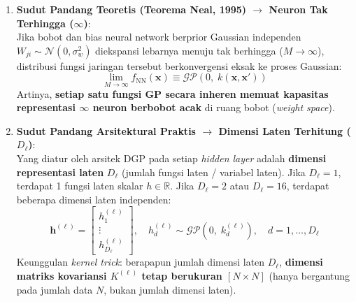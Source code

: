 \documentclass[11pt,a4paper]{article}
\begin{document}
\begin{enumerate}
    \item \textbf{Sudut Pandang Teoretis (Teorema Neal, 1995) $\to$ Neuron Tak Terhingga ($\infty$)}: \\
    Jika bobot dan bias neural network berprior Gaussian independen $W_{ji} \sim \mathcal{N}(0, \sigma_w^2)$ diekspansi lebarnya menuju tak berhingga ($M \to \infty$), distribusi fungsi jaringan tersebut berkonvergensi eksak ke proses Gaussian:
    \begin{equation}
        \lim_{M \to \infty} f_{\mathrm{NN}}(\mathbf{x}) \equiv \mathcal{GP}\left( 0, \; k(\mathbf{x}, \mathbf{x}') \right)
    \end{equation}
    Artinya, \textbf{setiap satu fungsi GP secara inheren memuat kapasitas representasi $\infty$ neuron berbobot acak} di ruang bobot (\textit{weight space}).
    
    \item \textbf{Sudut Pandang Arsitektural Praktis $\to$ Dimensi Laten Terhitung ($D_\ell$)}: \\
    Yang diatur oleh arsitek DGP pada setiap \textit{hidden layer} adalah \textbf{dimensi representasi laten} $D_\ell$ (jumlah fungsi laten / variabel laten). Jika $D_\ell = 1$, terdapat 1 fungsi laten skalar $h \in \mathbb{R}$. Jika $D_\ell = 2$ atau $D_\ell = 16$, terdapat beberapa dimensi laten independen:
    \begin{equation}
        \mathbf{h}^{(\ell)} = \begin{bmatrix} h_1^{(\ell)} \\ \vdots \\ h_{D_\ell}^{(\ell)} \end{bmatrix}, \quad h_d^{(\ell)} \sim \mathcal{GP}\left(0, \; k_d^{(\ell)}\right), \quad d = 1, \dots, D_\ell
    \end{equation}
    Keunggulan \textit{kernel trick}: berapapun jumlah dimensi laten $D_\ell$, \textbf{dimensi matriks kovariansi $K^{(\ell)}$ tetap berukuran $[N \times N]$} (hanya bergantung pada jumlah data $N$, bukan jumlah dimensi laten).
\end{enumerate}
\end{document}
